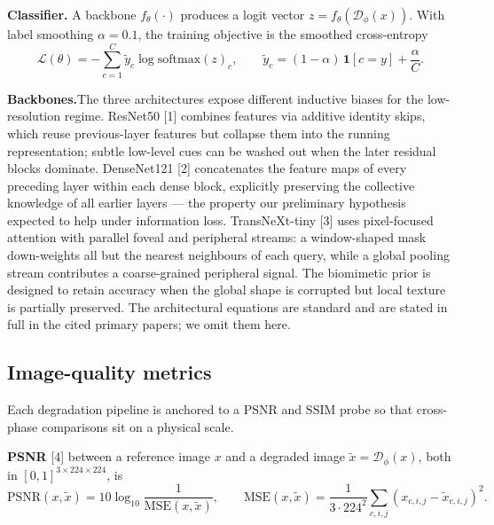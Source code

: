 \textbf{Classifier.}\quad
A backbone $f_{\theta}(\cdot)$ produces a logit vector
$z = f_{\theta}(\mathcal{D}_{\phi}(x))$. With label smoothing $\alpha = 0.1$,
the training objective is the smoothed cross-entropy
\begin{equation}
  \mathcal{L}(\theta) = -\sum_{c=1}^{C} \tilde y_c \log \mathrm{softmax}(z)_c,
  \qquad
  \tilde y_c = (1 - \alpha)\, \mathbf{1}[c = y] + \frac{\alpha}{C}.
  \label{eq:loss}
\end{equation}

\textbf{Backbones.}\quad The three architectures expose different
inductive biases for the low-resolution regime. ResNet50
[1] combines features via additive identity skips, which
reuse previous-layer features but collapse them into the running
representation; subtle low-level cues can be washed out when the later
residual blocks dominate. DenseNet121 [2]
concatenates the feature maps of every preceding layer within each
dense block, explicitly preserving the collective knowledge of all
earlier layers --- the property our preliminary hypothesis expected to
help under information loss. TransNeXt-tiny [3]
uses pixel-focused attention with parallel foveal and peripheral
streams: a window-shaped mask down-weights all but the nearest
neighbours of each query, while a global pooling stream contributes a
coarse-grained peripheral signal. The biomimetic prior is designed to
retain accuracy when the global shape is corrupted but local texture
is partially preserved. The architectural equations are standard and
are stated in full in the cited primary papers; we omit them here.

\subsection{Image-quality metrics}
\label{sec:design:psnr}

Each degradation pipeline is anchored to a $\mathrm{PSNR}$ and $\mathrm{SSIM}$
probe so that cross-phase comparisons sit on a physical scale.

\textbf{PSNR} [4] between a reference image $x$ and a
degraded image $\tilde x = \mathcal{D}_{\phi}(x)$, both in $[0, 1]^{3 \times 224 \times 224}$, is
\begin{equation}
  \mathrm{PSNR}(x, \tilde x) = 10 \log_{10} \frac{1}{\mathrm{MSE}(x, \tilde x)},
  \qquad
  \mathrm{MSE}(x, \tilde x) = \frac{1}{3 \cdot 224^2} \sum_{c, i, j} (x_{c,i,j} - \tilde x_{c,i,j})^2.
  \label{eq:psnr}
\end{equation}

